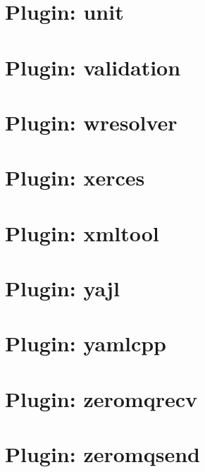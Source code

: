 \let\mypdfximage\pdfximage\def\pdfximage{\immediate\mypdfximage}\documentclass[twoside]{book}
\newcommand{\+}{\discretionary{\mbox{\scriptsize$\hookleftarrow$}}{}{}}
\begin{document}
\chapter{Plugin\+: unit}
\label{md_src_plugins_unit_README}

\chapter{Plugin\+: validation}
\label{md_src_plugins_validation_README}

\chapter{Plugin\+: wresolver}
\label{md_src_plugins_wresolver_README}

\chapter{Plugin\+: xerces}
\label{md_src_plugins_xerces_README}

\chapter{Plugin\+: xmltool}
\label{md_src_plugins_xmltool_README}

\chapter{Plugin\+: yajl}
\label{md_src_plugins_yajl_README}

\chapter{Plugin\+: yamlcpp}
\label{md_src_plugins_yamlcpp_README}

\chapter{Plugin\+: zeromqrecv}
\label{md_src_plugins_zeromqrecv_README}

\chapter{Plugin\+: zeromqsend}
\label{md_src_plugins_zeromqsend_README}

\end{document}
